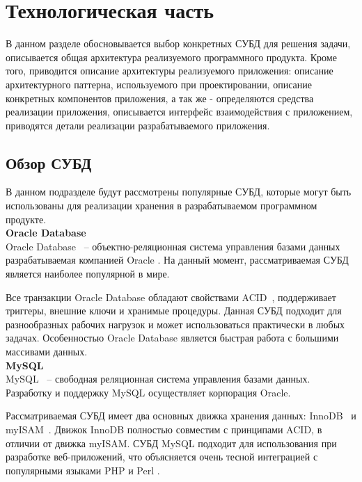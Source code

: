 \chapter{Технологическая часть}

В данном разделе обосновывается выбор конкретных СУБД для решения задачи, описывается общая архитектура реализуемого программного продукта. Кроме того, приводится описание архитектуры реализуемого приложения: описание архитектурного паттерна, используемого при проектировании, описание конкретных компонентов приложения, а так же - определяются средства реализации приложения, описывается интерфейс взаимодействия с приложением, приводятся детали реализации разрабатываемого приложения.

\section{Обзор СУБД}

В данном подразделе будут рассмотрены популярные СУБД, которые могут быть использованы для реализации хранения в разрабатываемом программном продукте.\\

\noindent\textbf{Oracle Database}\\

Oracle Database~\cite{oracle} -- объектно-реляционная система управления базами данных разрабатываемая компанией Oracle \cite{oracle-company}. На данный момент, рассматриваемая СУБД является наиболее популярной в мире. \cite{oracle-popular}

Все транзакции Oracle Database обладают свойствами ACID~\cite{acid}, поддерживает триггеры, внешние ключи и хранимые процедуры. Данная СУБД подходит для разнообразных рабочих нагрузок и может использоваться практически в любых задачах. Особенностью Oracle Database является быстрая работа с большими массивами данных.\\

\noindent\textbf{MySQL}\\

MySQL~\cite{mysql} -- свободная реляционная система управления базами данных. Разработку и поддержку MySQL осуществляет корпорация Oracle.

Рассматриваемая СУБД имеет два основных движка хранения данных: InnoDB~\cite{innodb} и myISAM~\cite{myisam}. Движок InnoDB полностью совместим с принципами ACID, в отличии от движка myISAM. СУБД MySQL подходит для использования при разработке веб-приложений, что объясняется очень тесной интеграцией с популярными языками PHP \cite{php} и Perl \cite{perl}.

